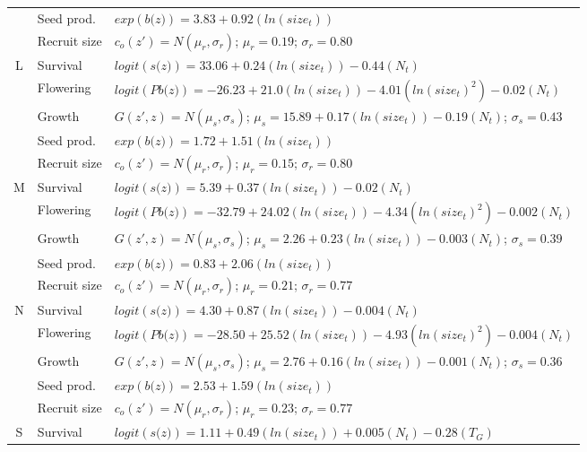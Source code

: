\documentclass[12pt, letterpaper]{article}
\begin{document}
\begin{spacing}{1.3}
\begin{longtable}[ht!]{c|l|p{}}
         & Seed prod.  & $exp(\textit{b(z)}) = 3.83 + 0.92(ln(size_t))$  \\
         \rowcolor[gray]{.95}& Recruit size  &  $c_o(z') = N(\mu_r, \sigma_r)$; $\mu_r = 0.19$; $\sigma_r = 0.80$ \\
         \hline
         L  &  Survival  &  $logit(\textit{s(z)})= 33.06 + 0.24(ln(size_t)) -0.44(N_t)$ \\
         \rowcolor[gray]{.95}& Flowering  & $logit(\textit{Pb(z)})  = -26.23 + 21.0(ln(size_t)) -4.01(ln(size_t)^2) -0.02(N_t)$ \\
         & Growth  &  $G(z',z) = N(\mu_s, \sigma_s)$; $\mu_s = 15.89 + 0.17(ln(size_t)) -0.19(N_t)$; $\sigma_s = 0.43$\\
         \rowcolor[gray]{.95}& Seed prod.  & $exp(\textit{b(z)}) = 1.72 + 1.51(ln(size_t))$  \\
         & Recruit size  &  $c_o(z') = N(\mu_r, \sigma_r)$; $\mu_r = 0.15$; $\sigma_r = 0.80$ \\
         \hline
         \rowcolor[gray]{.95}M  &  Survival  &  $logit(\textit{s(z)})= 5.39 + 0.37(ln(size_t)) -0.02(N_t)$ \\
         & Flowering  & $logit(\textit{Pb(z)})  = -32.79 + 24.02(ln(size_t)) -4.34(ln(size_t)^2) -0.002(N_t)$ \\
         \rowcolor[gray]{.95}& Growth  &  $G(z',z) = N(\mu_s, \sigma_s)$; $\mu_s = 2.26 + 0.23(ln(size_t)) - 0.003(N_t)$; $\sigma_s = 0.39$\\
         & Seed prod.  & $exp(\textit{b(z)}) = 0.83 + 2.06(ln(size_t))$  \\
         \rowcolor[gray]{.95}& Recruit size  &  $c_o(z') = N(\mu_r, \sigma_r)$; $\mu_r = 0.21$; $\sigma_r = 0.77$ \\
         \hline
         N  &  Survival  &  $logit(\textit{s(z)})= 4.30 + 0.87(ln(size_t)) -0.004(N_t)$ \\
         \rowcolor[gray]{.95}& Flowering  & $logit(\textit{Pb(z)})  = -28.50 + 25.52(ln(size_t)) -4.93(ln(size_t)^2) -0.004(N_t)$ \\
         & Growth  &  $G(z',z) = N(\mu_s, \sigma_s)$; $\mu_s = 2.76 + 0.16(ln(size_t)) - 0.001(N_t)$; $\sigma_s = 0.36$\\
         \rowcolor[gray]{.95}& Seed prod.  & $exp(\textit{b(z)}) = 2.53 + 1.59(ln(size_t))$  \\
         & Recruit size  &  $c_o(z') = N(\mu_r, \sigma_r)$; $\mu_r = 0.23$; $\sigma_r = 0.77$ \\
         \hline
         \rowcolor[gray]{.95}S  &  Survival  &  $logit(\textit{s(z)})= 1.11 + 0.49(ln(size_t)) + 0.005(N_t) - 0.28 (T_G)$ \\

\end{longtable}
\end{spacing}
\end{document}
